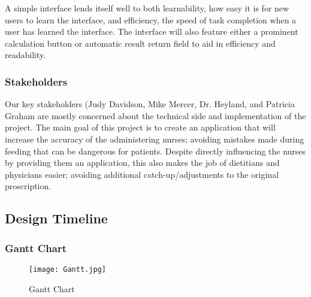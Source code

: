 \documentclass[onecolumn, draftclsnofoot,10pt, compsoc]{IEEEtran}
\begin{document}
A simple interface lends itself well to both learnability, how easy it is for new users to learn the interface, and efficiency, the speed of task completion when a user has learned the interface.
The interface will also feature either a prominent calculation button or automatic result return field to aid in efficiency and readability.
\subsubsection{Stakeholders}%
Our key stakeholders (Judy Davidson, Mike Mercer, Dr. Heyland, and Patricia Graham are mostly concerned about the technical side and implementation of the project. The main goal of this project is to create an application that will increase the accuracy of the administering nurses; avoiding mistakes made during feeding that can be dangerous for patients. Despite directly influencing the nurses by providing them an application, this also makes the job of dietitians and physicians easier; avoiding additional catch-up/adjustments to the original proscription. 
\subsection{Design Timeline}
\subsubsection{Gantt Chart}
\begin{figure}[h!]
\centering
\texttt{[image: Gantt.jpg]}
\centering
\caption{Gantt Chart}
\label{fig:gantt_chartl}
\end{figure}
\end{document}
